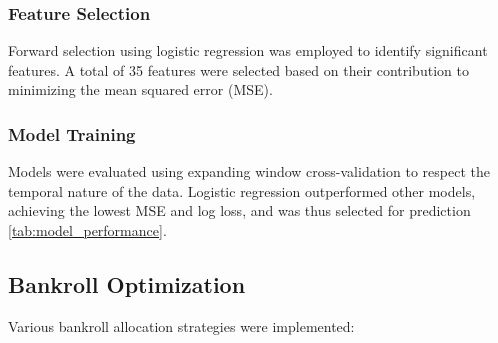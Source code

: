 \documentclass[6pt,twocolumn]{article}
\begin{document}
\subsubsection{Feature Selection}
Forward selection using logistic regression was employed to identify significant features. A total of 35 features were selected based on their contribution to minimizing the mean squared error (MSE).

\subsubsection{Model Training}
Models were evaluated using expanding window cross-validation to respect the temporal nature of the data. Logistic regression outperformed other models, achieving the lowest MSE and log loss, and was thus selected for prediction \ref{tab:model_performance}.

\begin{table}[h]
\centering
{}
\caption{Model Performance Comparison}
\label{tab:model_performance}

\end{table}

\subsection{Bankroll Optimization}
Various bankroll allocation strategies were implemented:
\end{document}
